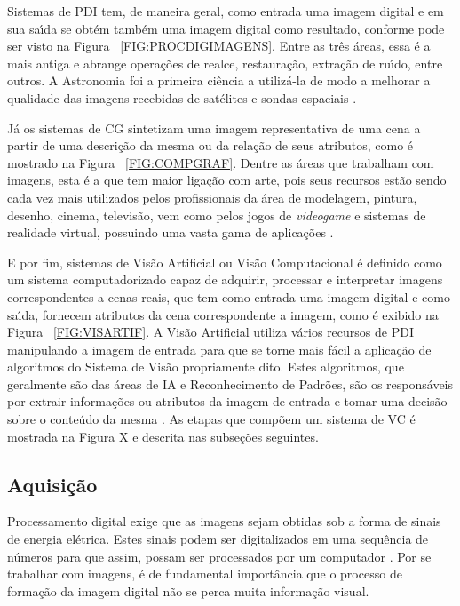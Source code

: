Sistemas de \ac{PDI} tem, de maneira geral, como entrada uma imagem digital e em sua sa\'{\i}da se obt\'{e}m tamb\'{e}m uma imagem digital como 
resultado, conforme pode ser visto na Figura ~\ref{FIG:PROCDIGIMAGENS}. Entre as tr\^{e}s \'{a}reas, essa \'{e} a mais antiga e abrange 
opera\c{c}\~{o}es de realce, restaura\c{c}\~{a}o, extra\c{c}\~{a}o de ru\'{\i}do, entre outros. A Astronomia foi a primeira ci\^{e}ncia a utiliz\'{a}-la de modo a 
melhorar a qualidade das imagens recebidas de sat\'{e}lites e sondas espaciais \cite{HEIDJEN:1995}.

J\'{a} os sistemas de \ac{CG} sintetizam uma imagem representativa de uma cena a partir de uma descri\c{c}\~{a}o da mesma ou da rela\c{c}\~{a}o de 
seus atributos, como \'{e} mostrado na Figura ~\ref{FIG:COMPGRAF}. Dentre as \'{a}reas que trabalham com imagens, esta \'{e} a que tem maior 
liga\c{c}\~{a}o com arte, pois seus recursos est\~{a}o sendo cada vez mais utilizados pelos profissionais da \'{a}rea de modelagem, pintura, 
desenho, cinema, televis\~{a}o, vem como pelos jogos de \emph{videogame} e sistemas de realidade virtual, possuindo uma vasta gama de 
aplica\c{c}\~{o}es \cite{HEIDJEN:1995}.

E por fim, sistemas de Vis\~{a}o Artificial ou Vis\~{a}o Computacional \'{e} definido como um sistema computadorizado capaz de adquirir, 
processar e interpretar imagens correspondentes a cenas reais, que tem como entrada uma imagem digital e como sa\'{\i}da, fornecem 
atributos da cena correspondente a imagem, como \'{e} exibido na Figura ~\ref{FIG:VISARTIF}. A Vis\~{a}o Artificial utiliza v\'{a}rios 
recursos de \ac{PDI} manipulando a imagem de entrada para que se torne mais f\'{a}cil a aplica\c{c}\~{a}o de algoritmos do Sistema de Vis\~{a}o 
propriamente dito. Estes algoritmos, que geralmente s\~{a}o das \'{a}reas de \ac{IA} e Reconhecimento de Padr\~{o}es, s\~{a}o os respons\'{a}veis por 
extrair informa\c{c}\~{o}es ou atributos da imagem de entrada e tomar uma decis\~{a}o sobre o conte\'{u}do da mesma 
\cite{HEIDJEN:1995}\cite{AUZUIR:2005}. As etapas que comp\~{o}em um sistema de \ac{VC} \'{e} mostrada na Figura X e descrita nas subse\c{c}\~{o}es 
seguintes.

\subsection{Aquisi\c{c}\~{a}o}

Processamento digital exige que as imagens sejam obtidas sob a forma de sinais de energia el\'{e}trica. Estes sinais podem ser 
digitalizados em uma sequ\^{e}ncia de n\'{u}meros para que assim, possam ser processados por um computador \cite{JAHNE:2005}. Por se 
trabalhar com imagens, \'{e} de fundamental import\^{a}ncia que o processo de forma\c{c}\~{a}o da imagem digital n\~{a}o se perca muita informa\c{c}\~{a}o 
visual\cite{BOVIK:2009}.

